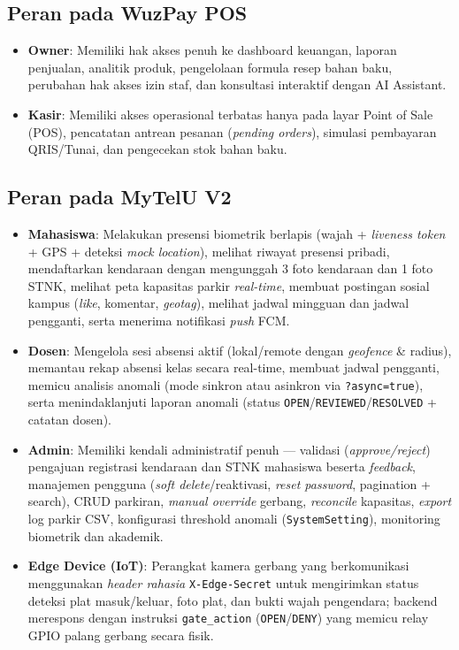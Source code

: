 \documentclass[12pt,titlepage,a4paper]{report}
\begin{document}
\subsection{Peran pada WuzPay POS}
\begin{itemize}
    \item \textbf{Owner}: Memiliki hak akses penuh ke dashboard keuangan, laporan penjualan, analitik produk, pengelolaan formula resep bahan baku, perubahan hak akses izin staf, dan konsultasi interaktif dengan AI Assistant.
    \item \textbf{Kasir}: Memiliki akses operasional terbatas hanya pada layar Point of Sale (POS), pencatatan antrean pesanan (\textit{pending orders}), simulasi pembayaran QRIS/Tunai, dan pengecekan stok bahan baku.
\end{itemize}

\subsection{Peran pada MyTelU V2}
\begin{itemize}
    \item \textbf{Mahasiswa}: Melakukan presensi biometrik berlapis (wajah + \textit{liveness token} + GPS + deteksi \textit{mock location}), melihat riwayat presensi pribadi, mendaftarkan kendaraan dengan mengunggah 3 foto kendaraan dan 1 foto STNK, melihat peta kapasitas parkir \textit{real-time}, membuat postingan sosial kampus (\textit{like}, komentar, \textit{geotag}), melihat jadwal mingguan dan jadwal pengganti, serta menerima notifikasi \textit{push} FCM.
    \item \textbf{Dosen}: Mengelola sesi absensi aktif (lokal/remote dengan \textit{geofence} \& radius), memantau rekap absensi kelas secara real-time, membuat jadwal pengganti, memicu analisis anomali (mode sinkron atau asinkron via \texttt{?async=true}), serta menindaklanjuti laporan anomali (status \texttt{OPEN}/\texttt{REVIEWED}/\texttt{RESOLVED} + catatan dosen).
    \item \textbf{Admin}: Memiliki kendali administratif penuh --- validasi (\textit{approve/reject}) pengajuan registrasi kendaraan dan STNK mahasiswa beserta \textit{feedback}, manajemen pengguna (\textit{soft delete}/reaktivasi, \textit{reset password}, pagination + search), CRUD parkiran, \textit{manual override} gerbang, \textit{reconcile} kapasitas, \textit{export} log parkir CSV, konfigurasi threshold anomali (\texttt{SystemSetting}), monitoring biometrik dan akademik.
    \item \textbf{Edge Device (IoT)}: Perangkat kamera gerbang yang berkomunikasi menggunakan \textit{header rahasia} \texttt{X-Edge-Secret} untuk mengirimkan status deteksi plat masuk/keluar, foto plat, dan bukti wajah pengendara; backend merespons dengan instruksi \texttt{gate\_action} (\texttt{OPEN}/\texttt{DENY}) yang memicu relay GPIO palang gerbang secara fisik.
\end{itemize}
\end{document}
